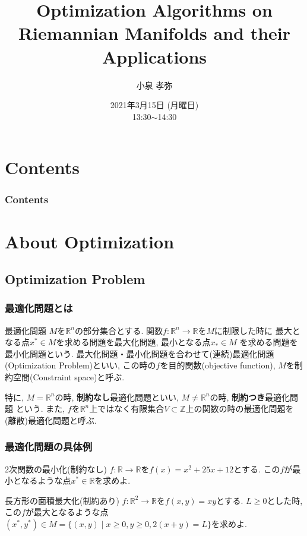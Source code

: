 \documentclass[dvipdfmx,11pt]{beamer}		%
\title{Optimization Algorithms on Riemannian Manifolds and their Applications}
\author{小泉 孝弥}
\institute{立命館大学理工学部数理科学科4回生}
\date{2021年3月15日 (月曜日)\\ 13:30$\sim$14:30}
\newcommand{\R}{\mathbb{R}}
\newcommand{\Z}{\mathbb{Z}}
\begin{document}
    \begin{frame}\frametitle{}
        \titlepage
    \end{frame}
    \section*{Contents}
    \begin{frame}\frametitle{Contents}
        \begin{multicols}{2}
            \tableofcontents
        \end{multicols}
    \end{frame}
\section{About Optimization}
    \subsection{Optimization Problem}
    \begin{frame}
        \frametitle{最適化問題とは}
        \begin{block}{最適化問題}
            $M$を$\R^n$の部分集合とする. 関数$f : \R^n\to\R$を$M$に制限した時に
            最大となる点$x^*\in M$を求める問題を最大化問題, 最小となる点$x_*\in M$
            を求める問題を最小化問題という. 最大化問題・最小化問題を合わせて(連続)最適化問題(Optimization Problem)といい, 
            この時の$f$を目的関数(objective function), $M$を制約空間(Constraint space)と呼ぶ. 
        \end{block}
        特に, $M = \R^n$の時, \textbf{制約なし}最適化問題といい, $M\neq\R^n$の時, \textbf{制約つき}最適化問題
        という. また, $f$を$\R^n$上ではなく有限集合$V\subset\Z$上の関数の時の最適化問題を 
        (離散)最適化問題と呼ぶ. 
    \end{frame}
    \begin{frame}
        \frametitle{最適化問題の具体例}
        \begin{exampleblock}{2次関数の最小化(制約なし)}
            $f : \R\to\R$を$f(x) = x^2 + 25x + 12$とする. 
            この$f$が最小となるような点$x^*\in\R$を求めよ.
        \end{exampleblock}
        \begin{exampleblock}{長方形の面積最大化(制約あり)}
            $f : \R^2\to\R$を$f(x, y) = xy$とする. $L\geq 0$とした時, 
            この$f$が最大となるような点$(x^*, y^*)\in M = \{(x, y)\mid x\geq 0, y\geq0, 2(x + y) = L\}$を求めよ.
        \end{exampleblock}        
    \end{frame}
\end{document}
